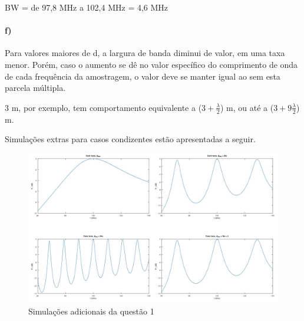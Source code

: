 \documentclass[12pt,a4paper]{article}
\begin{document}
BW = de 97,8 MHz a 102,4 MHz = 4,6 MHz

\paragraph{f)} Para valores maiores de d, a largura de banda diminui de valor, em uma taxa menor. Porém, caso o aumento se dê no valor específico do comprimento de onda de cada frequência da amostragem, o valor deve se manter igual ao sem esta parcela múltipla.

$3$ m, por exemplo, tem comportamento equivalente a ($3+\frac{\lambda}{2}$) m, ou até a ($3+9\frac{\lambda}{2}$) m.

Simulações extras para casos condizentes estão apresentadas a seguir.

\vspace{1.5cm}

\begin{center}
    \begin{figure}[h]
    \hspace{-55pt}
    \includegraphics[width=1.24\textwidth]{estendidas.jpg}

    \caption{Simulações adicionais da questão 1}
    \label{fig:awesome_image}
    
    \end{figure}
\end{center}

\newpage
\section{}
\end{document}
